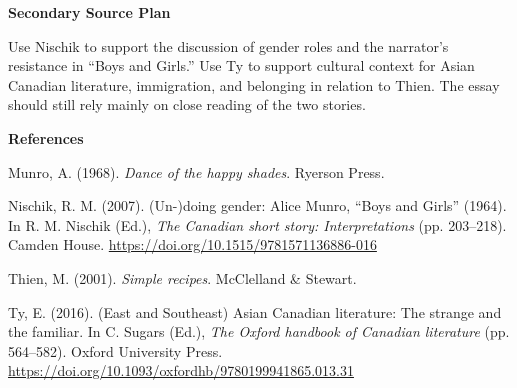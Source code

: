\documentclass[12pt]{article}
\begin{document}
\textbf{Secondary Source Plan}

Use Nischik to support the discussion of gender roles and the narrator's resistance in ``Boys and Girls.'' Use Ty to support cultural context for Asian Canadian literature, immigration, and belonging in relation to Thien. The essay should still rely mainly on close reading of the two stories.

\clearpage
\begin{center}
\textbf{References}
\end{center}
\raggedright

\hangindent=0.5in\noindent Munro, A. (1968). \textit{Dance of the happy shades}. Ryerson Press.

\hangindent=0.5in\noindent Nischik, R. M. (2007). (Un-)doing gender: Alice Munro, ``Boys and Girls'' (1964). In R. M. Nischik (Ed.), \textit{The Canadian short story: Interpretations} (pp. 203--218). Camden House. \url{https://doi.org/10.1515/9781571136886-016}

\hangindent=0.5in\noindent Thien, M. (2001). \textit{Simple recipes}. McClelland \& Stewart.

\hangindent=0.5in\noindent Ty, E. (2016). (East and Southeast) Asian Canadian literature: The strange and the familiar. In C. Sugars (Ed.), \textit{The Oxford handbook of Canadian literature} (pp. 564--582). Oxford University Press. \url{https://doi.org/10.1093/oxfordhb/9780199941865.013.31}
\end{document}
